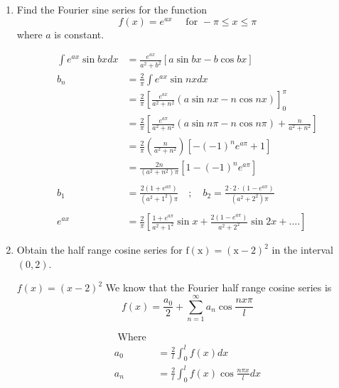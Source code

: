 \begin{enumerate}[label=\color{ocre}\textbf{\arabic*.}]
\begin{answer}
\end{answer}
\item  Find the Fourier sine series for the function
$$
f(x)=e^{a x} \quad \text { for }-\pi \leq x \leq \pi
$$
where $a$ is constant.
\begin{answer}
	\begin{align*}
		\int e^{a x} \sin b x d x&=\frac{e^{a x}}{a^{2}+b^{2}}[a \sin b x-b \cos b x] \\
		b_{n}&=\frac{2}{\pi} \int e^{a x} \sin n x d x \\
		&=\frac{2}{\pi}\left[\frac{e^{a x}}{a^{2}+n^{2}}(a \sin n x-n \cos n x)\right]_{0}^{\pi} \\
		&=\frac{2}{\pi}\left[\frac{e^{a \pi}}{a^{2}+n^{2}}(a \sin n \pi-n \cos n \pi)+\frac{n}{a^{2}+n^{2}}\right] \\
		&=\frac{2}{\pi}\left(\frac{n}{a^{2}+n^{2}}\right)\left[-(-1)^{n} e^{a \pi}+1\right]\\&=\frac{2 n}{\left(a^{2}+n^{2}\right) \pi}\left[1-(-1)^{n} e^{a \pi}\right] \\\\
		b_{1}&=\frac{2\left(1+e^{a \pi}\right)}{\left(a^{2}+1^{2}\right) \pi} \quad ; \quad b_{2}=\frac{2 \cdot 2 \cdot\left(1-e^{a \pi}\right)}{\left(a^{2}+2^{2}\right) \pi} \\\\
		e^{a x}&=\frac{2}{\pi}\left[\frac{1+e^{a \pi}}{a^{2}+1^{2}} \sin x+\frac{2\left(1-e^{a \pi}\right)}{a^{2}+2^{2}} \sin 2 x+\ldots .\right]
	\end{align*}
\end{answer}
\item Obtain the half range cosine series for $\mathrm{f}(\mathrm{x})=(\mathrm{x}-2)^{2}$ in the interval $(0,2)$.
\begin{answer}
	$f(x)=(x-2)^{2}$
	We know that the Fourier half range cosine series is
	$$
	f(x)=\frac{a_{0}}{2}+\sum_{n=1}^{\infty} a_{n} \cos \frac{n x \pi}{l}
	$$

	
	\begin{align*}
	\text { Where } \\
	a_{0}&=\frac{2}{l} \int_{0}^{l} f(x) d x \\
	a_{n}&=\frac{2}{l} \int_{0}^{l} f(x) \cos \frac{n \pi x}{l} d x
	\end{align*}


\end{answer}
\end{enumerate}
